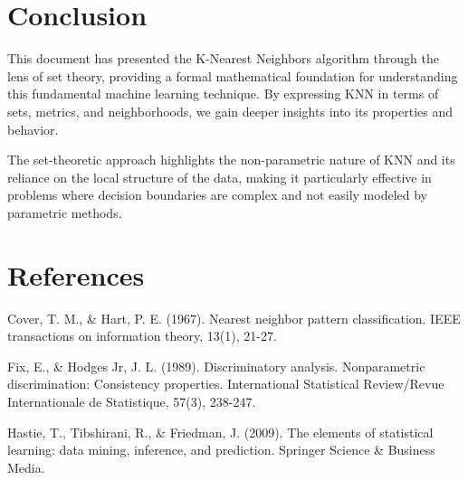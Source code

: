 \documentclass[12pt,a4paper]{article}
\begin{document}
\section{Conclusion}
This document has presented the K-Nearest Neighbors algorithm through the lens of set theory, providing a formal mathematical foundation for understanding this fundamental machine learning technique. By expressing KNN in terms of sets, metrics, and neighborhoods, we gain deeper insights into its properties and behavior.

The set-theoretic approach highlights the non-parametric nature of KNN and its reliance on the local structure of the data, making it particularly effective in problems where decision boundaries are complex and not easily modeled by parametric methods.

\section{References}
\begin{thebibliography}{9}
Cover, T. M., \& Hart, P. E. (1967). Nearest neighbor pattern classification. IEEE transactions on information theory, 13(1), 21-27.

Fix, E., \& Hodges Jr, J. L. (1989). Discriminatory analysis. Nonparametric discrimination: Consistency properties. International Statistical Review/Revue Internationale de Statistique, 57(3), 238-247.

Hastie, T., Tibshirani, R., \& Friedman, J. (2009). The elements of statistical learning: data mining, inference, and prediction. Springer Science \& Business Media.
\end{thebibliography}
\end{document}
